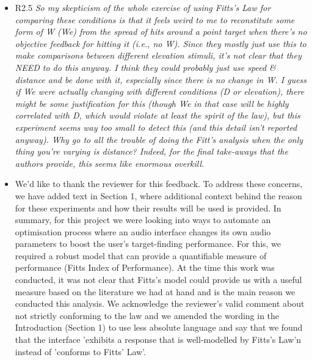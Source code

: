 \documentclass{scrartcl}
\begin{document}
\begin{itemize}
  \item R2.5 \textit{So my skepticism of the whole exercise of using Fitts’s Law for comparing these conditions is that it feels weird to me to reconstitute some form of W (We) from the spread of hits around a point target when there’s no objective feedback for hitting it (i.e., no W). Since they mostly just use this to make comparisons between different elevation stimuli, it’s not clear that they NEED to do this anyway. I think they could probably just use speed \& distance and be done with it, especially since there is no change in W. I guess if We were actually changing with different conditions (D or elevation), there might be some justification for this (though We in that case will be highly correlated with D, which would violate at least the spirit of the law), but this experiment seems way too small to detect this (and this detail isn’t reported anyway). Why go to all the trouble of doing the Fitt’s analysis when the only thing you’re varying is distance? Indeed, for the final take-aways that the authors provide, this seems like enormous overkill.}
  \item[] We'd like to thank the reviewer for this feedback.
    To address these concerns, we have added text in Section 1, where additional context behind the reason for these experiments and how their results will be used is provided. 
    In summary, for this project we were looking into ways to automate an optimisation process where an audio interface changes its own audio parameters to boost the user's target-finding performance.
    For this, we required a robust model that can provide a quantifiable measure of performance (Fitts Index of Performance).
    At the time this work was conducted, it was not clear that Fitts's model could provide us with a useful measure based on the literature we had at hand and is the main reason we conducted this analysis.
    We acknowledge the reviewer's valid comment about not strictly conforming to the law and we amended the wording in the Introduction (Section 1) to use less absolute language and say that we found that the interface 'exhibits a response that is well-modelled by Fitts’s Law'n instead of 'conforms to Fitts' Law'.


\end{itemize}
\end{document}
